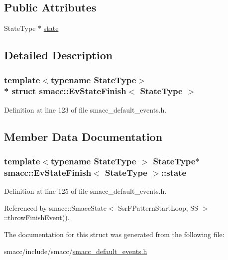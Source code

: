 \subsection*{Public Attributes}
\begin{DoxyCompactItemize}
\item 
State\+Type $\ast$ \hyperlink{structsmacc_1_1EvStateFinish_aa3a3ee44e35e32c7b803926331cb164d}{state}
\end{DoxyCompactItemize}


\subsection{Detailed Description}
\subsubsection*{template$<$typename State\+Type$>$\\*
struct smacc\+::\+Ev\+State\+Finish$<$ State\+Type $>$}



Definition at line 123 of file smacc\+\_\+default\+\_\+events.\+h.



\subsection{Member Data Documentation}
\subsubsection[{\texorpdfstring{state}{state}}]{\setlength{\rightskip}{0pt plus 5cm}template$<$typename State\+Type $>$ State\+Type$\ast$ {\bf smacc\+::\+Ev\+State\+Finish}$<$ State\+Type $>$\+::state}\hypertarget{structsmacc_1_1EvStateFinish_aa3a3ee44e35e32c7b803926331cb164d}{}\label{structsmacc_1_1EvStateFinish_aa3a3ee44e35e32c7b803926331cb164d}


Definition at line 125 of file smacc\+\_\+default\+\_\+events.\+h.



Referenced by smacc\+::\+Smacc\+State$<$ Ssr\+F\+Pattern\+Start\+Loop, S\+S $>$\+::throw\+Finish\+Event().



The documentation for this struct was generated from the following file\+:\begin{DoxyCompactItemize}
\item 
smacc/include/smacc/\hyperlink{smacc__default__events_8h}{smacc\+\_\+default\+\_\+events.\+h}\end{DoxyCompactItemize}
